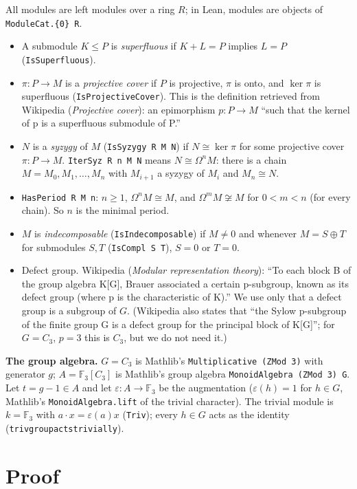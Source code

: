 \documentclass[11pt]{article}
\renewcommand{\_}{\oldus\allowbreak}
\theoremstyle{definition}
\theoremstyle{remark}
\begin{document}
All modules are left modules over a ring $R$; in Lean, modules are objects of
\texttt{ModuleCat.\{0\} R}.
\begin{itemize}[leftmargin=1.5em]
\item A submodule $K\le P$ is \emph{superfluous} if $K+L=P$ implies $L=P$ (\texttt{IsSuperfluous}).
\item $\pi:P\to M$ is a \emph{projective cover} if $P$ is projective, $\pi$ is onto, and
$\ker\pi$ is superfluous (\texttt{IsProjectiveCover}). This is the definition retrieved from
Wikipedia (\emph{Projective cover}): an epimorphism $p:P\to M$ ``such that the kernel of p is a
superfluous submodule of P.''
\item $N$ is a \emph{syzygy} of $M$ (\texttt{IsSyzygy R M N}) if $N\cong\ker\pi$ for some projective
cover $\pi:P\to M$. \texttt{IterSyz R n M N} means $N\cong\Omega^n M$: there is a chain
$M=M_0,M_1,\dots,M_n$ with $M_{i+1}$ a syzygy of $M_i$ and $M_n\cong N$.
\item \texttt{HasPeriod R M n}: $n\ge1$, $\Omega^n M\cong M$, and $\Omega^m M\not\cong M$ for
$0<m<n$ (for every chain). So $n$ is the minimal period.
\item $M$ is \emph{indecomposable} (\texttt{IsIndecomposable}) if $M\ne0$ and whenever
$M=S\oplus T$ for submodules $S,T$ (\texttt{IsCompl S T}), $S=0$ or $T=0$.
\item Defect group. Wikipedia (\emph{Modular representation theory}): ``To each block B of the group
algebra K[G], Brauer associated a certain p-subgroup, known as its defect group (where p is the
characteristic of K).'' We use only that a defect group is a subgroup of $G$. (Wikipedia also states
that ``the Sylow p-subgroup of the finite group G is a defect group for the principal block of
K[G]''; for $G=C_3$, $p=3$ this is $C_3$, but we do not need it.)
\end{itemize}

\textbf{The group algebra.} $G=C_3$ is Mathlib's \texttt{Multiplicative (ZMod 3)} with generator
$g$; $A=\mathbb{F}_3[C_3]$ is Mathlib's group algebra \texttt{MonoidAlgebra (ZMod 3) G}. Let
$t=g-1\in A$ and let $\varepsilon:A\to\mathbb{F}_3$ be the augmentation ($\varepsilon(h)=1$ for
$h\in G$, Mathlib's \texttt{MonoidAlgebra.lift} of the trivial character). The trivial module is
$k=\mathbb{F}_3$ with $a\cdot x=\varepsilon(a)x$ (\texttt{Triv}); every $h\in G$ acts as the identity
(\texttt{triv\_group\_acts\_trivially}).

\section{Proof}
\end{document}
